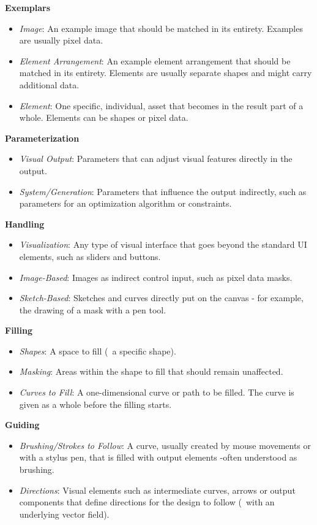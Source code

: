 \noindent\textbf{Exemplars}
\begin{itemize}
    \item \textit{Image}: An example image that should be matched in its entirety. Examples are usually pixel data.
    \item \textit{Element Arrangement}: An example element arrangement that should be matched in its entirety. Elements are usually separate shapes and might carry additional data.
    \item \textit{Element}: One specific, individual, asset that becomes in the result part of a whole. Elements can be shapes or pixel data.
\end{itemize}

\noindent\textbf{Parameterization}
\begin{itemize}
    \item \textit{Visual Output}: Parameters that can adjust visual features directly in the output.
    \item \textit{System/Generation}: Parameters that influence the output indirectly, such as parameters for an optimization algorithm or constraints.
\end{itemize}

\noindent\textbf{Handling}
\begin{itemize}
    \item \textit{Visualization}: Any type of visual interface that goes beyond the standard UI elements, such as sliders and buttons.
    \item \textit{Image-Based}: Images as indirect control input, such as pixel data masks.
    \item \textit{Sketch-Based}: Sketches and curves directly put on the canvas - for example, the drawing of a mask with a pen tool.
\end{itemize}

\noindent\textbf{Filling}
\begin{itemize}
    \item \textit{Shapes}: A space to fill (\eg~a specific shape).
    \item \textit{Masking}: Areas within the shape to fill that should remain unaffected.
    \item \textit{Curves to Fill}: A one-dimensional curve or path to be filled. The curve is given as a whole before the filling starts.
\end{itemize}

\noindent\textbf{Guiding}
\begin{itemize}
    \item \textit{Brushing/Strokes to Follow}: A curve, usually created by mouse movements or with a stylus pen, that is filled with output elements -often understood as brushing.
    \item \textit{Directions}: Visual elements such as intermediate curves, arrows or output components that define directions for the design to follow (\eg~with an underlying vector field).
\end{itemize}

